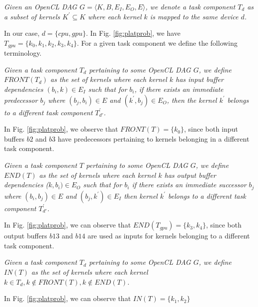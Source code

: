 	\begin{definition} \label{def:task-component}
		\emph{Given an OpenCL DAG $G=\langle K,B,E_I,E_O,E \rangle$, we denote a task component $T_d$ as a subset of kernels $K^\prime \subseteq K$  where each kernel $k$ is mapped to the same device $d$.} 
	\end{definition}

	\par In our case, $d= \{ cpu,gpu \}$. In Fig. \ref{fig:platprob}, we have $T_{gpu} = \{k_0,k_1,k_2,k_3,k_4 \}$. For a given task component we define the following terminology.
	\begin{definition}
		\emph{Given a task component $T_d$ pertaining to some OpenCL DAG $G$, we define $FRONT(T_d)$ as the set of kernels where each kernel $k$ has input buffer dependencies $(b_i,k) \in E_I$ such that for $b_i$, if there exists an immediate predecessor $b_j$ where $(b_j,b_i)\in E$ and $(k^\prime,b_j) \in E_O$, then the kernel $k^\prime$ belongs to a different task component $T^\prime_{d'}$.} 
	\end{definition}
	In Fig. \ref{fig:platprob}, we observe that $FRONT(T) = \{ k_0\}$, since both input buffers $b2$ and $b3$ have predecessors pertaining to kernels belonging in a different task component. 
	\begin{definition}\emph{
		Given a task component $T$ pertaining to some OpenCL DAG $G$, we define $END(T)$ as the set of kernels where each kernel $k$ has output buffer dependencies ($k,b_i) \in E_O$ such that for $b_i$ if there exists an immediate successor $b_j$ where $(b_i,b_j)\in E$ and $(b_j,k^\prime) \in E_I$ then kernel $k^\prime$ belongs to a different task component $T^\prime_{d'}$.}
	\end{definition}
	In Fig. \ref{fig:platprob}, we can observe that $END(T_{gpu})=\{k_3,k_4\}$, since both output buffers $b13$ and $b14$ are used as inputs for kernels belonging to a different task component.
	\begin{definition}\emph{
		Given a task component $T_d$ pertaining to some OpenCL DAG $G$, we define $IN(T)$ as the set of kernels where each kernel $k \in T_d, k \notin FRONT(T), k \notin END(T)$. } 
	\end{definition}
	In Fig. \ref{fig:platprob}, we can observe that $IN(T)=\{k_1, k_2 \}$
	
